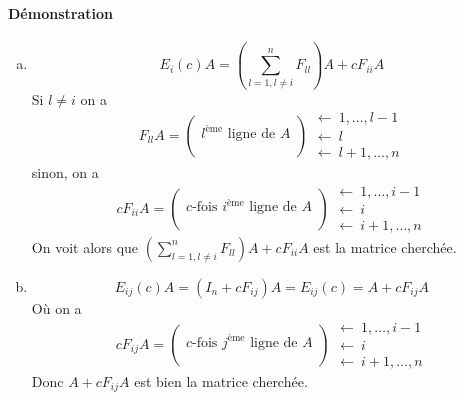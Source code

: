 \paragraph{Démonstration}
\begin{enumerate}[a)]
  \item $$E_i(c) A = \left( \sum_{l=1, l\neq i}^n F_{ll} \right) A +  c F_{ii} A$$
    Si $l\neq i$ on a
    $$F_{ll} A =
      \begin{pmatrix} 
        \\ l^{\text{ème}} \text{ ligne de } A \\ \\
      \end{pmatrix} 
      \begin{array}{l} 
        \leftarrow ~ 1, \ldots, l-1 \\ \leftarrow ~ l \\ \leftarrow ~ l+1, \ldots, n 
      \end{array}$$
    sinon, on a
    $$c F_{ii} A =
      \begin{pmatrix}
        \\ c\text{-fois } i^{\text{ème}} \text{ ligne de } A \\ \\
      \end{pmatrix} 
      \begin{array}{l} 
        \leftarrow ~ 1, \ldots, i-1 \\ \leftarrow ~ i \\ \leftarrow ~ i+1, \ldots, n 
      \end{array}$$
    On voit alors que $\left( \sum_{l=1, l\neq i}^n F_{ll} \right) A +  c F_{ii} A$ est la matrice cherchée.
    
  \item $$E_{ij}(c) A = (I_n + c F_{ij}) A = E_{ij}(c) = A + c F_{ij} A$$
    Où on a
      $$c F_{ij} A =
        \begin{pmatrix}
          \\ c\text{-fois } j^{\text{ème}} \text{ ligne de } A \\ \\
        \end{pmatrix} 
        \begin{array}{l} 
          \leftarrow ~ 1, \ldots, i-1 \\ \leftarrow ~ i \\ \leftarrow ~ i+1, \ldots, n 
        \end{array}$$
    Donc $A + c F_{ij} A$ est bien la matrice cherchée.
    

\end{enumerate}
